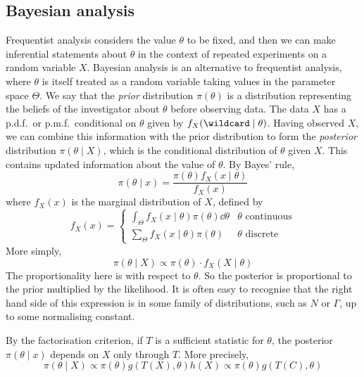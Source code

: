 \subsection{Bayesian analysis}
Frequentist analysis considers the value \( \theta \) to be fixed, and then we can make inferential statements about \( \theta \) in the context of repeated experiments on a random variable \( X \).
Bayesian analysis is an alternative to frequentist analysis, where \( \theta \) is itself treated as a random variable taking values in the parameter space \( \Theta \).
We say that the \textit{prior} distribution \( \pi(\theta) \) is a distribution representing the beliefs of the investigator about \( \theta \) before observing data.
The data \( X \) has a p.d.f.\ or p.m.f.\ conditional on \( \theta \) given by \( f_X(\wildcard \mid \theta) \).
Having observed \( X \), we can combine this information with the prior distribution to form the \textit{posterior} distribution \( \pi(\theta \mid X) \), which is the conditional distribution of \( \theta \) given \( X \).
This contains updated information about the value of \( \theta \).
By Bayes' rule,
\[ \pi(\theta \mid x) = \frac{\pi(\theta) f_X(x \mid \theta)}{f_X(x)} \]
where \( f_X(x) \) is the marginal distribution of \( X \), defined by
\[ f_X(x) = \begin{cases}
	\int_\Theta f_X(x\mid\theta) \pi(\theta) \dd{\theta} & \theta \text{ continuous} \\
	\sum_\Theta f_X(x\mid\theta) \pi(\theta) & \theta \text{ discrete}
\end{cases} \]
More simply,
\[ \pi(\theta \mid X) \propto \pi(\theta) \cdot f_X(X \mid \theta) \]
The proportionality here is with respect to \( \theta \).
So the posterior is proportional to the prior multiplied by the likelihood.
It is often easy to recognise that the right hand side of this expression is in some family of distributions, such as \( N \) or \( \Gamma \), up to some normalising constant.
\begin{remark}
	By the factorisation criterion, if \( T \) is a sufficient statistic for \( \theta \), the posterior \( \pi(\theta \mid x) \) depends on \( X \) only through \( T \).
	More precisely,
	\[ \pi(\theta \mid X) \propto \pi(\theta) g(T(X),\theta) h(X) \propto \pi(\theta) g(T(C),\theta) \]
\end{remark}
